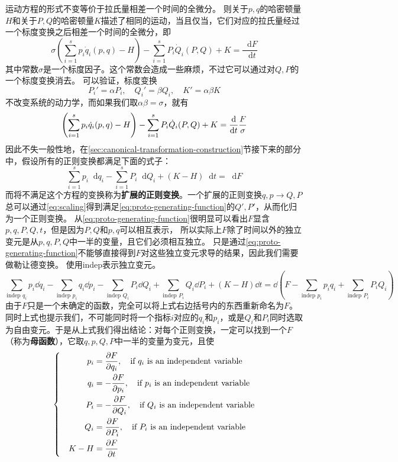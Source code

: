 \documentclass[UTF8, a4paper]{ctexart}
\newcommand*{\diff}{\mathop{}\!\mathrm{d}}
\newenvironment{bigcase}{\left\{\quad\begin{aligned}}{\end{aligned}\right.}
\begin{document}
运动方程的形式不变等价于拉氏量相差一个时间的全微分。
则关于$p, q$的哈密顿量$H$和关于$P, Q$的哈密顿量$K$描述了相同的运动，当且仅当，它们对应的拉氏量经过一个标度变换之后相差一个时间的全微分，即
\[
    \sigma \left(\sum_{i=1}^s p_i \dot{q}_i(p, q) - H \right) - \sum_{i=1}^s P_i \dot{Q}_i(P, Q) + K = \frac{\diff F}{\diff t}
\]
其中常数$\sigma$是一个标度因子。这个常数会造成一些麻烦，不过它可以通过对$Q, P$的一个标度变换消去。
可以验证，标度变换
\begin{equation}
    P_i' = \alpha P_i, \quad Q_i' = \beta Q_i, \quad K' = \alpha \beta K
    \label{eq:scaling}
\end{equation}
不改变系统的动力学，而如果我们取$\alpha \beta = \sigma$，就有
\[
    \left(\sum_{i=1}^s p_i \dot{q}_i(p, q) - H \right) - \sum_{i=1}^s P_i \dot{Q}_i(P, Q) + K = \dv{t} \frac{F}{\sigma}
\]
因此不失一般性地，在\ref{sec:canonical-transformation-construction}节接下来的部分中，假设所有的正则变换都满足下面的式子：
\begin{equation}
    \sum_{i=1}^s p_i \diff q_i - \sum_{i=1}^s P_i \diff Q_i + (K - H) \diff t = \diff F
    \label{eq:proto-generating-function}
\end{equation}
而将不满足这个方程的变换称为\textbf{扩展的正则变换}。一个扩展的正则变换$q,p \longrightarrow Q, P$总可以通过\eqref{eq:scaling}得到满足\eqref{eq:proto-generating-function}的$Q', P'$，从而化归为一个正则变换。
从\eqref{eq:proto-generating-function}很明显可以看出$F$显含$p, q, P, Q, t$，但是因为$P, Q$和$p, q$可以相互表示，
所以实际上$F$除了时间以外的独立变元是从$p, q, P, Q$中一半的变量，且它们必须相互独立。
只是通过\eqref{eq:proto-generating-function}不能够直接得到$F$对这些独立变元求导的结果，因此我们需要做勒让德变换。
使用indep表示独立变元。
\[
    \sum_{\text{indep } q_i} p_i \dd q_i - \sum_{\text{indep } p_i} q_i \dd p_i - \sum_{\text{indep }Q_i} P_i \dd Q_i + \sum_{\text{indep }P_i} Q_i \dd P_i + (K - H) \dd t = \dd \left( F - \sum_{\text{indep } p_i} p_i q_i + \sum_{\text{indep }P_i} P_i Q_i \right)
\]
由于$F$只是一个未确定的函数，完全可以将上式右边括号内的东西重新命名为$F$。同时上式也提示我们，不可能同时将一个指标$i$对应的$q_i$和$p_i$，或是$Q_i$和$P_i$同时选取为自由变元。于是从上式我们得出结论：对每个正则变换，一定可以找到一个$F$（称为\textbf{母函数}），它取$q, p, Q, P$中一半的变量为变元，且使
\begin{equation}
    \begin{bigcase}
        p_i &= \pdv{F}{q_i}, \quad \text{if $q_i$ is an independent variable} \\
        q_i &= -\pdv{F}{p_i}, \quad \text{if $p_i$ is an independent variable} \\
        P_i &= - \pdv{F}{Q_i}, \quad \text{if $Q_i$ is an independent variable} \\
        Q_i &= \pdv{F}{P_i}, \quad \text{if $P_i$ is an independent variable} \\
        K - H &= \pdv{F}{t}
    \end{bigcase}
    \label{eq:generating-function}
\end{equation}
\end{document}
